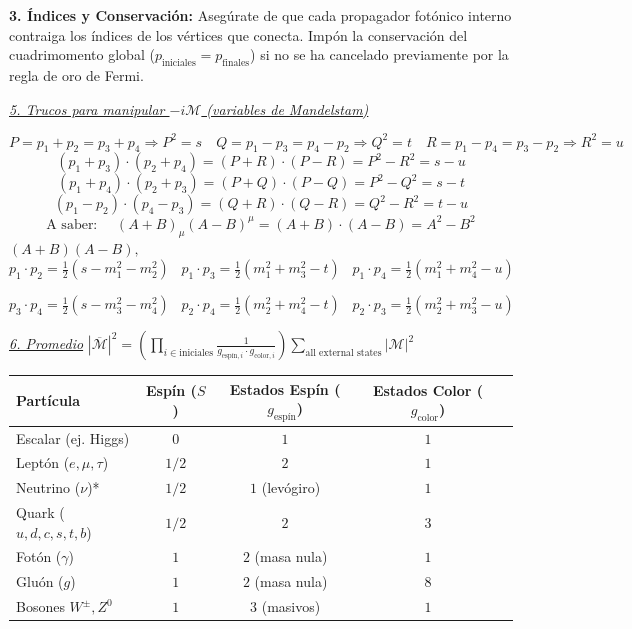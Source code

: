 \textbf{3. Índices y Conservación:} 
    Asegúrate de que cada propagador fotónico interno contraiga los índices de los vértices que conecta. Impón la conservación del cuadrimomento global ($p_{\text{iniciales}} = p_{\text{finales}}$) si no se ha cancelado previamente por la regla de oro de Fermi.

\underline{\textit{5. Trucos para manipular $-i \mathcal{M}$ (variables de Mandelstam)}}

$$P \!=\! p_1 + p_2 \!=\! p_3 + p_4  \!\Rightarrow\! P^2 \!=\!s \quad Q \!=\! p_1 - p_3 \!=\! p_4 - p_2  \!\Rightarrow\! Q^2 \!=\! t\quad R \!=\! p_1 - p_4 \!=\! p_3 - p_2  \!\Rightarrow\! R^2 \!=\! u$$
\vspace{-0.5mm}
$$(p_1+p_3) \cdot (p_2+p_4) \!=\! (P+R) \cdot (P-R) \!=\! P^2 - R^2 \!=\! s - u$$$$(p_1+p_4) \cdot (p_2+p_3) \!=\! (P+Q) \cdot (P-Q) \!=\! P^2 - Q^2 \!=\! s - t$$$$(p_1-p_2) \cdot (p_4-p_3) \!=\! (Q+R) \cdot (Q-R) \!=\! Q^2 - R^2 \!=\! t - u$$
\vspace{-0.5mm}
$$\text{A saber: }\quad (A+B)_\mu (A-B)^\mu =  (A+B) \cdot (A-B) = A^2 - B^2$$
\vspace{-0.5mm}
 $(A+B)(A-B),$ \vspace{1.5mm}
$p_1 \cdot p_2 = \frac{1}{2}(s - m_1^2 - m_2^2) \;\;\; p_1 \cdot p_3 = \frac{1}{2}(m_1^2 + m_3^2 - t)\;\;\; p_1 \cdot p_4 = \frac{1}{2}(m_1^2 + m_4^2 - u)$

$p_3 \cdot p_4 = \frac{1}{2}(s - m_3^2 - m_4^2) \;\;\; p_2 \cdot p_4 = \frac{1}{2}(m_2^2 + m_4^2 - t)\;\;\;  p_2 \cdot p_3 = \frac{1}{2}(m_2^2 + m_3^2 - u)$
\vspace{1.5mm}



\underline{\textit{6. Promedio}} $|\overline{\mathcal{M}}|^2 = \left( \prod_{i \in \text{iniciales}} \frac{1}{g_{\text{espín}, i} \cdot g_{\text{color}, i}} \right) \sum_{\text{all external states}} |\mathcal{M}|^2$

{

\centering
\renewcommand{\arraystretch}{0.5}
\setlength{\tabcolsep}{2pt} 
\begin{tabular}{lcccc}
\toprule
\textbf{Partícula} & \textbf{Espín ($S$)} & \textbf{Estados Espín ($g_{\text{espín}}$)} & \textbf{Estados Color ($g_{\text{color}}$)} \\
\midrule
Escalar (ej. Higgs) & $0$ & $1$ & $1$  \\
Leptón ($e, \mu, \tau$) & $1/2$ & $2$ & $1$  \\
Neutrino ($\nu$)* & $1/2$ & $1$ (levógiro) & $1$  \\
Quark ($u, d, c, s, t, b$) & $1/2$ & $2$ & $3$  \\
Fotón ($\gamma$) & $1$ & $2$ (masa nula) & $1$  \\
Gluón ($g$) & $1$ & $2$ (masa nula) & $8$  \\
Bosones $W^\pm, Z^0$ & $1$ & $3$ (masivos) & $1$ \\
\bottomrule
\end{tabular}

}

